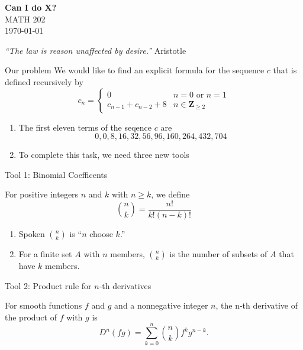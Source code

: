 \documentclass[portrait,fleqn,12pt]{beamer}
\newcommand{\integers}{\mathbf{Z}}
\newenvironment{handlist}
   {\begin{enumerate}[\faHandPointRight]
       \addtolength{\itemsep}{0.0\itemsep}}
     {\end{enumerate}}
\begin{document}
\begin{frame}
\begin{flushleft} 
\textbf{Can I do X?} \\
MATH 202 \\
\today 
\end{flushleft}


\emph{“The law is reason unaffected by desire.”} \hfill {\sc Aristotle } 
\end{frame}


\begin{frame}[fragile]{Our problem}
We would like to find an explicit formula for the sequence $c$ that is defined recursively by
\begin{equation}
  c_n= \begin{cases} 0 & n=0  \text{ or } n = 1 \\
                                 c_{n-1} + c_{n-2}+ 8 & n \in \integers_{\geq 2}
           \end{cases}
\end{equation}
\begin{handlist}
\item The first eleven terms of the seqence $c$ are
\begin{equation}
      0,0,8,16,32,56,96,160,264,432,704
\end{equation}
\item To complete this task, we need three new tools
\end{handlist}
\end{frame}
\begin{frame}{Tool 1:  Binomial Coefficents}

For positive integers $n$ and $k$ with $n \geq k$, we define
\begin{equation}
      \binom{n}{k} = \frac{n!}{k! (n-k)!}
\end{equation}
\begin{handlist}
 \item Spoken $\binom{n}{k}$ is ``$n$ choose $k$.''
 \item For a finite set $A$ with $n$ members,  $\binom{n}{k}$ is the number of subsets of $A$ that have $k$ members.
\end{handlist}
\end{frame}

\begin{frame}{Tool 2:  Product rule for $n$-th derivatives}

For smooth functions $f$ and $g$ and a nonnegative integer $n$, the n-th derivative of the product of $f$ with $g$ is
\begin{equation}
       D^n (f g) = \sum_{k=0}^n  \binom{n}{k}  f^{k} g^{n-k}.
\end{equation}
\end{frame}
\end{document}
